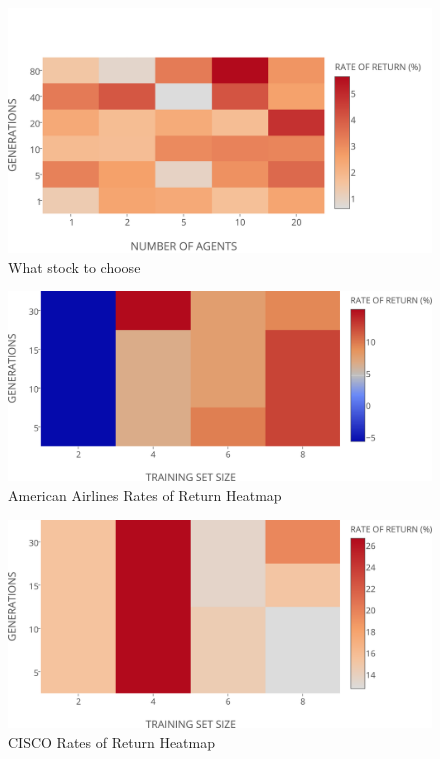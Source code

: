 \documentclass[a4paper,twoside]{article}
\begin{document}
\begin{figure}[h!]
\begin{center}
\includegraphics[width=1.00\columnwidth]{figures/rates-of-return-heatmap/rates-of-return-heatmap}
\caption{{\label{rates-of-return-heatmap}What stock to choose%
}}
\end{center}
\end{figure}

\begin{figure}[h!]
\begin{center}
\includegraphics[width=1.00\columnwidth]{figures/rates-of-return-aa-heatmap/rates-of-return-aa-heatmap}
\caption{{\label{aa-ror-heatmap}American Airlines Rates of Return Heatmap%
}}
\end{center}
\end{figure}

\begin{figure}[h!]
\begin{center}
\includegraphics[width=1.00\columnwidth]{figures/rates-of-return-csco-heatmap/rates-of-return-csco-heatmap}
\caption{{\label{csco-ror-heatmap}CISCO Rates of Return Heatmap%
}}
\end{center}
\end{figure}
\end{document}
